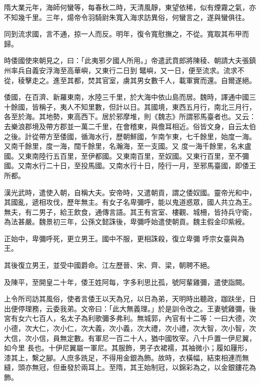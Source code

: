\begin{pinyinscope}
 隋大業元年，海師何蠻等，每春秋二時，天清風靜，東望依稀，似有煙霧之氣，亦不知幾千里。三年，煬帝令羽騎尉朱寬入海求訪異俗，何蠻言之，遂與蠻俱往。



 同到流求國，言不通，掠一人而反。明年，復令寬慰撫之，不從。寬取其布甲而歸。


時倭國使來朝見之，曰：「此夷邪夕國人所用。」帝遣武賁郎將陳稜、朝請大夫張鎮州率兵自義安浮海至高華嶼，又東行二日到
 鼊嶼，又一日，便至流求。流求不從，稜擊走之。進至其都，焚其官室，虜其男女數千人，載軍實而還。自爾遂絕。



 倭國，在百濟、新羅東南，水陸三千里，於大海中依山島而居。魏時，譯通中國三十餘國，皆稱子，夷人不知里數，但計以日。其國境，東西五月行，南北三月行，各至於海。其地勢，東高西下。居於邪摩堆，則《魏志》所謂邪馬臺者也。又云：去樂浪郡境及帶方郡並一萬二千里，在會稽東，與儋耳相近。俗皆文身，自云太伯之後。計從帶方至倭國，循海水行，歷朝鮮國，乍南乍東，七千餘里，始度一海。又南千餘里，度一海，闊千餘里，名瀚海，至一支國。又
 度一海千餘里，名末盧國。又東南陸行五百里，至伊都國。又東南百里，至奴國。又東行百里，至不彌國。又南水行二十日，至投馬國。又南水行十日，陸行一月，至邪馬臺國，即倭王所都。



 漢光武時，遣使入朝，自稱大夫。安帝時，又遣朝貢，謂之倭奴國。靈帝光和中，其國亂，遞相攻伐，歷年無主。有女子名卑彌呼，能以鬼道惑眾，國人共立為王。無夫，有二男子，給王飲食，通傳言語。其王有宮室、樓觀、城柵，皆持兵守衛，為法甚嚴。魏景初三年，公孫文懿誅後，卑彌呼始遣使朝貢。魏主假金印紫綬。



 正始中，卑彌呼死，更立男王。國中不服，更相誅殺，復立卑彌
 呼宗女臺與為王。



 其後復立男王，並受中國爵命。江左歷晉、宋、齊、梁，朝聘不絕。



 及陳平，至開皇二十年，倭王姓阿每，字多利思比孤，號阿輩雞彌，遣使詣闕。



 上令所司訪其風俗，使者言倭王以天為兄，以日為弟，天明時出聽政，跏趺坐，日出便停理務，云委我弟。文帝曰：「此大無義理。」於是訓令改之。王妻號雞彌，後宮有女六七百人，名太子為利歌彌多弗利。無城郭，內官有十二等：一曰大德，次小德，次大仁，次小仁，次大義，次小義，次大禮，次小禮，次大智，次小智，次大信，次小信，員無定數。有軍尼一百二十人，猶中國牧宰。八十戶置一伊尼翼，如今里
 長也。十伊尼翼屬一軍尼。其服飾，男子衣裙襦，其袖微小；履如屨形，漆其上，繫之腳。人庶多跣足，不得用金銀為飾。故時，衣橫幅，結束相連而無縫，頭亦無冠，但垂發於兩耳上。至隋，其王始制冠，以錦彩為之，以金銀鏤花為飾。




\end{pinyinscope}
